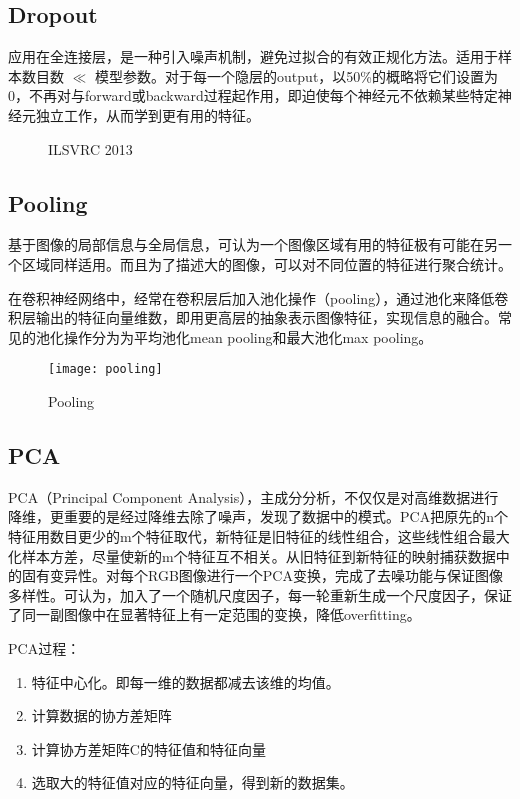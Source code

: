 \subsection{Dropout}
应用在全连接层，是一种引入噪声机制，避免过拟合的有效正规化方法。适用于样本数目数 $\ll$ 模型参数。对于每一个隐层的output，以50\%的概略将它们设置为0，不再对与forward或backward过程起作用，即迫使每个神经元不依赖某些特定神经元独立工作，从而学到更有用的特征。
\begin{figure}[!ht]
  \centering 
  \caption{ILSVRC 2013}
\end{figure}


\subsection{Pooling}
基于图像的局部信息与全局信息，可认为一个图像区域有用的特征极有可能在另一个区域同样适用。而且为了描述大的图像，可以对不同位置的特征进行聚合统计。

在卷积神经网络中，经常在卷积层后加入池化操作（pooling），通过池化来降低卷积层输出的特征向量维数，即用更高层的抽象表示图像特征，实现信息的融合。常见的池化操作分为为平均池化mean pooling和最大池化max pooling。
\begin{figure}[!ht]
\centering
\texttt{[image: pooling]}
\caption{Pooling}
\end{figure}

\subsection{PCA}
PCA（Principal Component Analysis），主成分分析，不仅仅是对高维数据进行降维，更重要的是经过降维去除了噪声，发现了数据中的模式。PCA把原先的n个特征用数目更少的m个特征取代，新特征是旧特征的线性组合，这些线性组合最大化样本方差，尽量使新的m个特征互不相关。从旧特征到新特征的映射捕获数据中的固有变异性。对每个RGB图像进行一个PCA变换，完成了去噪功能与保证图像多样性。可认为，加入了一个随机尺度因子，每一轮重新生成一个尺度因子，保证了同一副图像中在显著特征上有一定范围的变换，降低overfitting。

PCA过程：
\begin{enumerate}
\item 特征中心化。即每一维的数据都减去该维的均值。
\item 计算数据的协方差矩阵
\item 计算协方差矩阵C的特征值和特征向量
\item 选取大的特征值对应的特征向量，得到新的数据集。
\end{enumerate}


